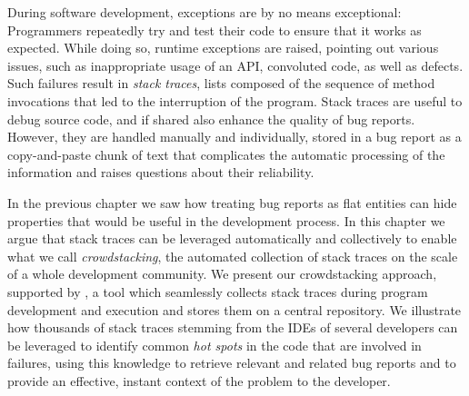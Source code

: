 



During software development, exceptions are by no means exceptional: Programmers repeatedly try and test their code to ensure that it works as expected.
While doing so, runtime exceptions are raised, pointing out various issues, such as inappropriate usage of an API, convoluted code, as well as defects.
Such failures result in \emph{stack traces}, lists composed of the sequence of method invocations that led to the interruption of the program.
Stack traces are useful to debug source code, and if shared also enhance the quality of bug reports.
However, they are handled manually and individually, stored in a bug report as a copy-and-paste chunk of text that complicates the automatic processing of the information and raises questions about their reliability.

In the previous chapter we saw how treating bug reports as flat entities can hide properties that would be useful in the development process.
In this chapter we argue that stack traces can be leveraged automatically and collectively to enable what we call \emph{crowdstacking}, the automated collection of stack traces on the scale of a whole development community.
We present our crowdstacking approach, supported by \slr, a tool which seamlessly collects stack traces during program development and execution and stores them on a central repository.
We illustrate how thousands of stack traces stemming from the IDEs of several developers can be leveraged to identify common \emph{hot spots} in the code that are involved in failures, using this knowledge to retrieve relevant and related bug reports and to provide an effective, instant context of the problem to the developer.

\structure

